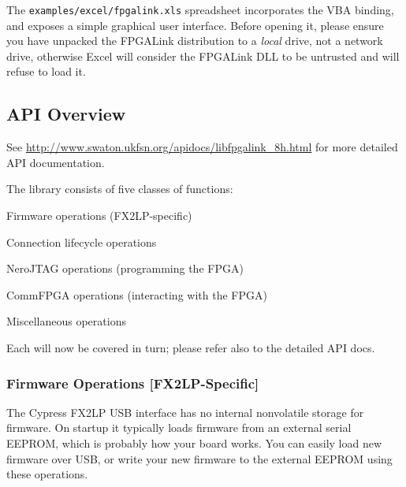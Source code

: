 The \texttt{examples/excel/fpgalink.xls} spreadsheet incorporates the VBA binding, and exposes a simple graphical user interface. Before opening it, please ensure you have unpacked the FPGALink distribution to a \textit{local} drive, not a network drive, otherwise Excel will consider the FPGALink DLL to be untrusted and will refuse to load it.

\subsection{API Overview}
See \url{http://www.swaton.ukfsn.org/apidocs/libfpgalink\_8h.html} for more detailed API documentation.

The library consists of five classes of functions:

\begin{blobs}
  \item Firmware operations (FX2LP-specific)
  \item Connection lifecycle operations
  \item NeroJTAG operations (programming the FPGA)
  \item CommFPGA operations (interacting with the FPGA)
  \item Miscellaneous operations
\end{blobs}

Each will now be covered in turn; please refer also to the detailed API docs.

\newpage
\subsubsection{Firmware Operations [FX2LP-Specific]}
The Cypress FX2LP USB interface has no internal nonvolatile storage for firmware. On startup it typically loads firmware from an external serial EEPROM, which is probably how your board works. You can easily load new firmware over USB, or write your new firmware to the external EEPROM using these operations.

